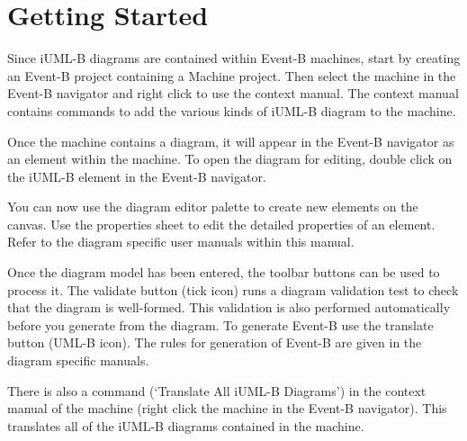 \section{Getting Started}
\label{sec:iumlb-gettingstarted}

Since iUML-B diagrams are contained within Event-B machines, start by creating an Event-B project containing a Machine project. 
Then select the machine in the Event-B navigator and right click to use the context manual. 
The context manual contains commands to add the various kinds of iUML-B diagram to the machine.

Once the machine contains a diagram, it will appear in the Event-B navigator as an element within the machine.
To open the diagram for editing, double click on the iUML-B element in the Event-B navigator.

You can now use the diagram editor palette to create new elements on the canvas. 
Use the properties sheet to edit the detailed properties of an element.
Refer to the diagram specific user manuals within this manual.

Once the diagram model has been entered, the toolbar buttons can be used to process it.
The validate button (tick icon) runs a diagram validation test to check that the diagram is well-formed.
This validation is also performed automatically before you generate from the diagram.
To generate Event-B use the translate button (UML-B icon). 
The rules for generation of Event-B are given in the diagram specific manuals.

There is also a command (`Translate All iUML-B Diagrams') in the context manual of the machine (right click the machine in the Event-B navigator).
This translates all of the iUML-B diagrams contained in the machine.

